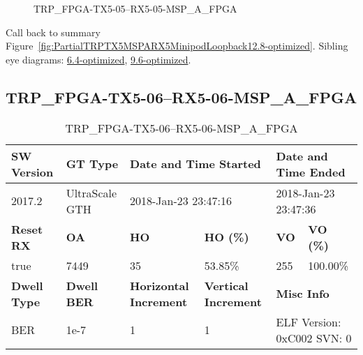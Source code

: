 \begin{figure}[h]
\caption{TRP\_FPGA-TX5-05--RX5-05-MSP\_A\_FPGA} \label{fig:TRPFPGATX505RX505MSPAFPGA12.8-optimized}
\end{figure}

Call back to summary Figure~\ref{fig:PartialTRPTX5MSPARX5MinipodLoopback12.8-optimized}.
Sibling eye diagrams: \hyperref[sec:TRPFPGATX505RX505MSPAFPGA6.4-optimized]{6.4-optimized}, \hyperref[sec:TRPFPGATX505RX505MSPAFPGA9.6-optimized]{9.6-optimized}.

\clearpage
\newpage


\subsection{TRP\_FPGA-TX5-06--RX5-06-MSP\_A\_FPGA}\label{sec:TRPFPGATX506RX506MSPAFPGA12.8-optimized}

\begin{table}[h]
\centering
\caption{TRP\_FPGA-TX5-06--RX5-06-MSP\_A\_FPGA}
\label{tab:TRPFPGATX506RX506MSPAFPGA12.8-optimized}
\begin{tabular}{@{}|l|l|l|l|l|l|@{}}
\toprule
\textbf{SW Version}                & \textbf{GT Type}   & \multicolumn{2}{l|}{\textbf{Date and Time Started}}            & \multicolumn{2}{l|}{\textbf{Date and Time Ended}}        \\ \midrule
2017.2                       & UltraScale GTH          & \multicolumn{2}{l|}{2018-Jan-23 23:47:16}                   & \multicolumn{2}{l|}{2018-Jan-23 23:47:36}               \\ \midrule
\textbf{Reset RX}                  & \textbf{OA} & \textbf{HO}   & \textbf{HO (\%)} & \textbf{VO} & \textbf{VO (\%)} \\ \midrule
true & 7449        & 35          & 53.85\%        & 255        & 100.00\%       \\ \midrule
\textbf{Dwell Type}                & \textbf{Dwell BER} & \textbf{Horizontal Increment} & \textbf{Vertical Increment}    & \multicolumn{2}{l|}{\textbf{Misc Info}}                  \\ \midrule
BER                            & 1e-7        & 1        & 1           & \multicolumn{2}{l|}{ELF Version: 0xC002 SVN: 0}                         \\ \bottomrule
\end{tabular}
\end{table}

